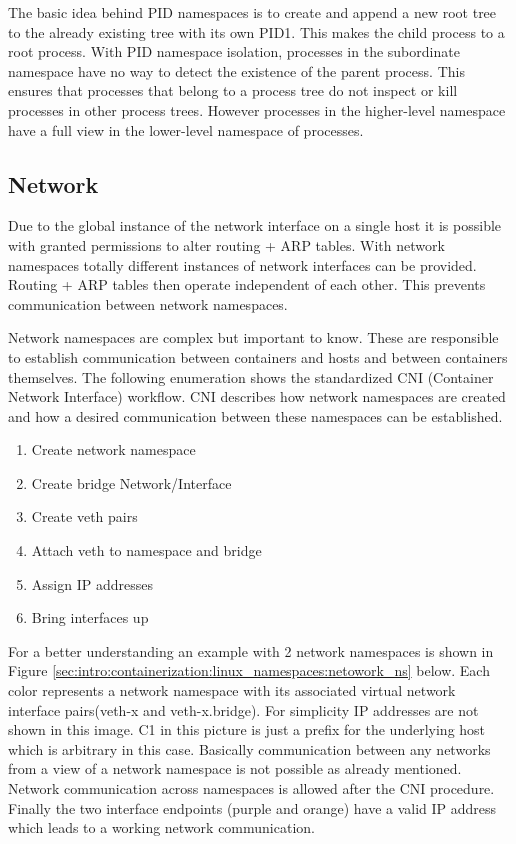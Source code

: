 The basic idea behind PID namespaces is to create and append a new root tree to the already existing tree with its own PID1. This makes the child process to a root process.
With PID namespace isolation, processes in the subordinate namespace have no way to detect the existence of the parent process. This ensures that processes that belong to a process tree do not inspect or kill processes in other process trees. However processes in the higher-level namespace have a full view in the lower-level namespace of processes.

\subsection{Network}
\label{sec:intro:containerization:linux_namespaces:network_namespaces}
Due to the global instance of the network interface on a single host it is possible with granted permissions to alter routing + ARP tables. With network namespaces totally different instances of network interfaces can be provided. Routing + ARP tables then operate independent of each other. This prevents communication between network namespaces.
 
Network namespaces are complex but important to know. These are responsible to establish communication between containers and hosts and between containers themselves. 
The following enumeration shows the standardized CNI (Container Network Interface) workflow. CNI describes how network namespaces are created and how a desired communication between these namespaces can be established.

\begin{enumerate}
\item Create network namespace
\item Create bridge Network/Interface
\item Create veth pairs
\item Attach veth to namespace and bridge
\item Assign IP addresses
\item Bring interfaces up
\end{enumerate}
For a better understanding an example with 2 network namespaces is shown in Figure \ref{sec:intro:containerization:linux_namespaces:netowork_ns} below. Each color represents a network namespace with its associated virtual network interface pairs(veth-x and veth-x.bridge). For simplicity IP addresses are not shown in this image. C1 in this picture is just a prefix for the underlying host which is arbitrary in this case. Basically communication between any networks from a view of a network namespace is not possible as already mentioned. Network communication across namespaces is allowed after the CNI procedure. Finally the two interface endpoints (purple and orange) have a valid IP address which leads to a working network communication.

